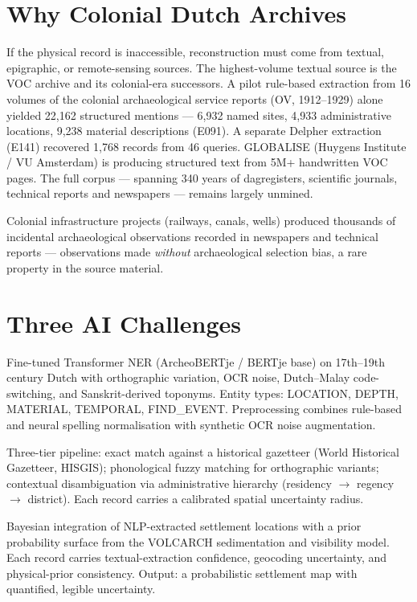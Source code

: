 \documentclass[11pt,a4paper]{article}
\begin{document}
\section{Why Colonial Dutch Archives}

If the physical record is inaccessible, reconstruction must come from textual, epigraphic, or remote-sensing sources. The highest-volume textual source is the VOC archive and its colonial-era successors. A pilot rule-based extraction from 16 volumes of the colonial archaeological service reports (OV, 1912--1929) alone yielded 22{,}162 structured mentions --- 6{,}932 named sites, 4{,}933 administrative locations, 9{,}238 material descriptions (E091). A separate Delpher extraction (E141) recovered 1{,}768 records from 46 queries. GLOBALISE (Huygens Institute / VU Amsterdam) is producing structured text from 5M+ handwritten VOC pages. The full corpus --- spanning 340 years of dagregisters, scientific journals, technical reports and newspapers --- remains largely unmined.

Colonial infrastructure projects (railways, canals, wells) produced thousands of incidental archaeological observations recorded in newspapers and technical reports --- observations made \emph{without} archaeological selection bias, a rare property in the source material.

\section{Three AI Challenges}

\begin{description}[style=nextline,leftmargin=1.5em]
  \item[Challenge 1 --- NER and IE for historical Dutch with code-switching.] Fine-tuned Transformer NER (ArcheoBERTje / BERTje base) on 17th--19th century Dutch with orthographic variation, OCR noise, Dutch--Malay code-switching, and Sanskrit-derived toponyms. Entity types: LOCATION, DEPTH, MATERIAL, TEMPORAL, FIND\_EVENT. Preprocessing combines rule-based and neural spelling normalisation with synthetic OCR noise augmentation.
  \item[Challenge 2 --- Historical place-name disambiguation.] Three-tier pipeline: exact match against a historical gazetteer (World Historical Gazetteer, HISGIS); phonological fuzzy matching for orthographic variants; contextual disambiguation via administrative hierarchy (residency $\rightarrow$ regency $\rightarrow$ district). Each record carries a calibrated spatial uncertainty radius.
  \item[Challenge 3 --- Integration of uncertain textual and spatial evidence.] Bayesian integration of NLP-extracted settlement locations with a prior probability surface from the VOLCARCH sedimentation and visibility model. Each record carries textual-extraction confidence, geocoding uncertainty, and physical-prior consistency. Output: a probabilistic settlement map with quantified, legible uncertainty.
\end{description}
\end{document}
